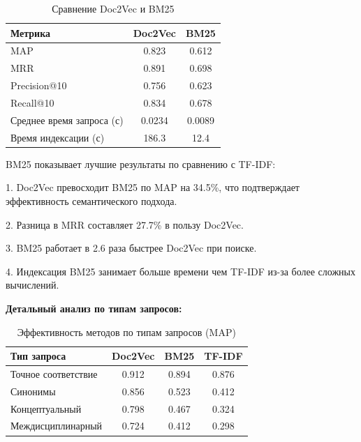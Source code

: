 \begin{table}[H]
	\caption{Сравнение Doc2Vec и BM25}
	\begin{center}
		\begin{tabular}{|l|c|c|}
			\hline
			\textbf{Метрика} & \textbf{Doc2Vec} & \textbf{BM25} \\
			\hline
			MAP & 0.823 & 0.612 \\
			\hline
			MRR & 0.891 & 0.698 \\
			\hline
			Precision@10 & 0.756 & 0.623 \\
			\hline
			Recall@10 & 0.834 & 0.678 \\
			\hline
			Среднее время запроса (с) & 0.0234 & 0.0089 \\
			\hline
			Время индексации (с) & 186.3 & 12.4 \\
			\hline
		\end{tabular}
	\end{center}
\end{table}

BM25 показывает лучшие результаты по сравнению с TF-IDF:

1. Doc2Vec превосходит BM25 по MAP на 34.5\%, что подтверждает эффективность семантического подхода.

2. Разница в MRR составляет 27.7\% в пользу Doc2Vec.

3. BM25 работает в 2.6 раза быстрее Doc2Vec при поиске.

4. Индексация BM25 занимает больше времени чем TF-IDF из-за более сложных вычислений.

\textbf{Детальный анализ по типам запросов:}

\begin{table}[H]
	\caption{Эффективность методов по типам запросов (MAP)}
	\begin{center}
		\begin{tabular}{|l|c|c|c|}
			\hline
			\textbf{Тип запроса} & \textbf{Doc2Vec} & \textbf{BM25} & \textbf{TF-IDF} \\
			\hline
			Точное соответствие & 0.912 & 0.894 & 0.876 \\
			\hline
			Синонимы & 0.856 & 0.523 & 0.412 \\
			\hline
			Концептуальный & 0.798 & 0.467 & 0.324 \\
			\hline
			Междисциплинарный & 0.724 & 0.412 & 0.298 \\
			\hline
		\end{tabular}
	\end{center}
\end{table}

